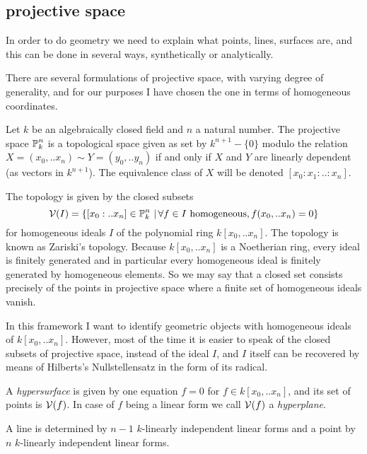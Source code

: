 \subsection{projective space}

In order to do geometry we need to explain what points, lines, surfaces are, and this can be done in several ways, synthetically or analytically.

There are several formulations of projective space, with varying degree of generality, and for our purposes I have chosen the one in terms of homogeneous coordinates.

Let $k$ be an algebraically closed field and $n$ a natural number.
The projective space $\operatorname{\mathbb P}^n_k$ is a topological space given as set by  $k^{n+1} - \{ 0 \}$ modulo the relation $X=(x_0,..x_n) \sim Y=(y_0,..y_n)$ if and only if $X$ and $Y$ are linearly dependent (as vectors in $k^{n+1}$). The equivalence class of $X$ will be denoted $[x_0:x_1:..:x_n]$.

The topology is given by the closed subsets
\begin{equation}
\operatorname{\mathcal V}(I) =
\left\lbrace [x_0:..x_n] \in \operatorname{\mathbb P}^n_k\,|\,  \forall f\in I \text{ homogeneous}, f(x_0,..x_n) = 0\right\rbrace
\end{equation}
for homogeneous ideals $I$ of the polynomial ring $k[x_0,..x_n]$.
The topology is known as Zariski's topology.
Because $k[x_0,..x_n]$ is a Noetherian ring, every ideal is finitely generated and in particular every homogeneous ideal is finitely generated by homogeneous elements.
So we may say that a closed set consists precisely of the points in projective space where a finite set of homogeneous ideals vanish.

In this framework I want to identify geometric objects with homogeneous ideals of $k[x_0,..x_n]$.
However, most of the time it is easier to speak of the closed subsets of projective space, instead of the ideal $I$, and $I$ itself can be recovered by means of Hilberts's Nullstellensatz in the form of its radical.

A \emph{hypersurface} is given by one equation $f=0$ for $f\in k[x_0,..x_n]$, and its set of points is $\operatorname{\mathcal V}(f)$.
In case of $f$ being a linear form we call $\operatorname{\mathcal V}(f)$ a \emph{hyperplane}.

A line is determined by $n-1$ $k$-linearly independent linear forms and a point by $n$ $k$-linearly independent linear forms.


